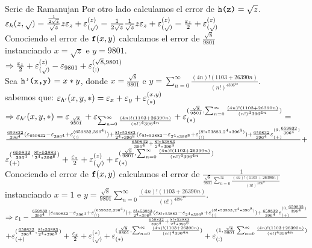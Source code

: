 \begin{section}{Serie de Ramanujan}
	Por otro lado calculamos el error de $\texttt{h(z)}=\sqrt{z}$.\\
	
	$\varepsilon _{h}({z,\sqrt{ }}) = \frac{\frac{1}{2\sqrt{z}}}{\sqrt{z}}z\varepsilon _{z} + \varepsilon _{({\sqrt{ }})}^{({z})} = \frac{1}{2\sqrt{z}}\frac{1}{\sqrt{z}}z\varepsilon _{z} + \varepsilon _{({\sqrt{ }})}^{({z})} = \frac{\varepsilon _{z}}{2} + \varepsilon _{({\sqrt{ }})}^{({z})}$\\
	
	Conociendo el error de $\texttt{f}(x,y)$ calculamos el error de $\frac{\sqrt{8}}{9801}$\\ instanciando $x=\sqrt{z}$ e $y=9801$.\\
	
	$\Rightarrow \frac{\varepsilon _{z}}{2} + \varepsilon _{({\sqrt{ }})}^{({z})} - \varepsilon _{9801} + \varepsilon _{({:})}^{({\sqrt{8},9801})}$\\
	
	Sea $\texttt{h'(x,y)}=x*y$, donde $x=\frac{\sqrt{8}}{9801}$ e $y=\sum_{n=0}^{\infty}{\frac{(4n)!(1103+26390n)}{(n!)^4396^{4n}}}$.\\
	
	sabemos que: $\varepsilon _{h'}({x,y,*}) = \varepsilon _{x} + \varepsilon _{y} + \varepsilon _{({*})}^{({x,y})}$\\
	
	$\Rightarrow \varepsilon _{h'}({x,y,*}) = \varepsilon _{\frac{\sqrt{8}}{9801}} + \varepsilon _{\sum_{n=0}^{\infty}{\frac{(4n)!(1103+26390n)}{(n!)^4396^{4n}}}} + \varepsilon _{({*})}^{({\frac{\sqrt{8}}{9801},\sum_{n=0}^{\infty}{\frac{(4n)!(1103+26390n)}{(n!)^4396^{4n}}}})} = $\\
	
	$\frac{\frac{659832}{396^4}(\varepsilon _{659832} - \varepsilon _{396^4} + \varepsilon _{({:})}^{({659832,396^4})}) + \frac{8!*53883}{2^4*396^8}(\varepsilon _{8!*53883} - \varepsilon _{2^4*396^8} + \varepsilon _{({:})}^{({8!*53883,2^4*396^8})}) + \frac{659832}{396^4}\varepsilon _{({+})}^{({0,\frac{659832}{396^4}})}}{\frac{659832}{396^4}+\frac{8!*53883}{2^4*396^8}} +$\\
	
	$\varepsilon _{({+})}^{({\frac{659832}{396^4},\frac{8!*53883}{2^4*396^8}})} + \frac{\varepsilon _{z}}{2} + \varepsilon _{({\sqrt{ }})}^{({z})}  + \varepsilon _{({*})}^{({\frac{\sqrt{8}}{9801},\sum_{n=0}^{\infty}{\frac{(4n)!(1103+26390n)}{(n!)^4396^{4n}}}})}$\\
	
	Conociendo el error de $\texttt{f}(x,y)$ calculamos el error de $\frac{1}{\frac{\sqrt{8}}{9801}\sum_{n=0}^{\infty}{\frac{(4n)!(1103+26390n)}{(n!)^4396^{4n}}}}$ instanciando $x=1$ e $y=\frac{\sqrt{8}}{9801}\sum_{n=0}^{\infty}{\frac{(4n)!(1103+26390n)}{(n!)^4396^{4n}}}$.\\
	
	$\Rightarrow \varepsilon _{1} - \frac{\frac{659832}{396^4}(\varepsilon _{659832} - \varepsilon _{396^4} + \varepsilon _{({:})}^{({659832,396^4})}) + \frac{8!*53883}{2^4*396^8}(\varepsilon _{8!*53883} - \varepsilon _{2^4*396^8} + \varepsilon _{({:})}^{({8!*53883,2^4*396^8})}) + \frac{659832}{396^4}\varepsilon _{({+})}^{({0,\frac{659832}{396^4}})}}{\frac{659832}{396^4}+\frac{8!*53883}{2^4*396^8}}$\\
	
	
	$+ \varepsilon _{({+})}^{({\frac{659832}{396^4},\frac{8!*53883}{2^4*396^8}})} + \frac{\varepsilon _{z}}{2} + \varepsilon _{({\sqrt{ }})}^{({z})}  + \varepsilon _{({*})}^{({\frac{\sqrt{8}}{9801},\sum_{n=0}^{\infty}{\frac{(4n)!(1103+26390n)}{(n!)^4396^{4n}}}})} + \varepsilon _{({:})}^{({1,\frac{\sqrt{8}}{9801}\sum_{n=0}^{\infty}{\frac{(4n)!(1103+26390n)}{(n!)^4396^{4n}}}})}$
	
\end{section}
